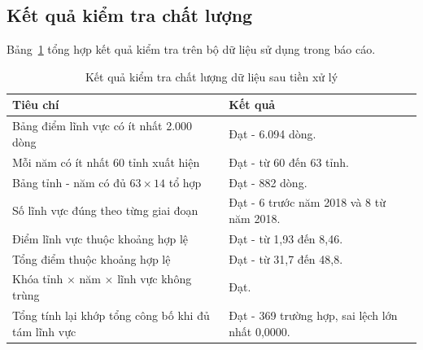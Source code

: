 \subsection{Kết quả kiểm tra chất lượng}

Bảng~\ref{tab:appendix-quality-checks} tổng hợp kết quả kiểm tra trên bộ dữ liệu sử dụng trong báo cáo.

\begin{table}[H]
    \centering
    \caption{Kết quả kiểm tra chất lượng dữ liệu sau tiền xử lý}
    \label{tab:appendix-quality-checks}
    \small
    \begin{tabularx}{\textwidth}{@{}>{\raggedright\arraybackslash}p{}>{\raggedright\arraybackslash}X@{}}
        \toprule
        \textbf{Tiêu chí} & \textbf{Kết quả} \\
        \midrule
        Bảng điểm lĩnh vực có ít nhất 2.000 dòng & Đạt - 6.094 dòng. \\
        Mỗi năm có ít nhất 60 tỉnh xuất hiện & Đạt - từ 60 đến 63 tỉnh. \\
        Bảng tỉnh - năm có đủ $63 \times 14$ tổ hợp & Đạt - 882 dòng. \\
        Số lĩnh vực đúng theo từng giai đoạn & Đạt - 6 trước năm 2018 và 8 từ năm 2018. \\
        Điểm lĩnh vực thuộc khoảng hợp lệ & Đạt - từ 1,93 đến 8,46. \\
        Tổng điểm thuộc khoảng hợp lệ & Đạt - từ 31,7 đến 48,8. \\
        Khóa tỉnh $\times$ năm $\times$ lĩnh vực không trùng & Đạt. \\
        Tổng tính lại khớp tổng công bố khi đủ tám lĩnh vực & Đạt - 369 trường hợp, sai lệch lớn nhất 0,0000. \\
        \bottomrule
    \end{tabularx}
\end{table}
